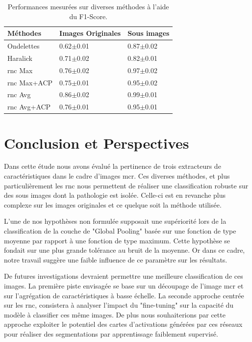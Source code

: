 \documentclass{gretsi}
\begin{document}
\begin{sloppypar}
\begin{table}[h]
\centering
    \begin{tabular*}{\linewidth}{l@{\extracolsep{\fill}}ll}
        \hline
        \textbf{Méthodes} & \textbf{Images Originales} & \textbf{Sous images}\\
        \hline
        Ondelettes & 0.62$\pm$0.01 & 0.87$\pm$0.02\\
        \hline
        Haralick & 0.71$\pm$0.02 & 0.82$\pm$0.01\\
        \hline
        \ac{rnc} Max & 0.76$\pm$0.02 & 0.97$\pm$0.02\\
        \hline
        \ac{rnc} Max+ACP & 0.75$\pm$0.01 & 0.95$\pm$0.02\\
        \hline
        \ac{rnc} Avg & 0.86$\pm$0.02 &0.99$\pm$0.01\\
        \hline
       \ac{rnc} Avg+ACP & 0.76$\pm$0.01 & 0.95$\pm$0.01\\
    \end{tabular*}
    \caption{Performances mesurées sur diverses méthodes à l'aide du F1-Score.}
    \label{scores}
\end{table}

\section{Conclusion et Perspectives}
\label{conclusion}
Dans cette étude nous avons évalué la pertinence de trois extracteurs de caractéristiques dans le cadre d'images \ac{mcr}. Ces diverses méthodes, et plus particulièrement les \ac{rnc} nous permettent de réaliser une classification robuste sur des sous images dont la pathologie est isolée. Celle-ci est en revanche plus complexe sur les images originales et ce quelque soit la méthode utilisée.\par 
L'une de nos hypothèses non formulée supposait une supériorité lors de la classification de la couche de "Global Pooling" basée sur une fonction de type moyenne par rapport à une fonction de type maximum. Cette hypothèse se fondait sur une plus grande tolérance au bruit de la moyenne. Or dans ce cadre, notre travail suggère une faible influence de ce paramètre sur les résultats.\par
De futures investigations devraient permettre une meilleure classification de ces images. La première piste envisagée se base sur un découpage de l'image \ac{mcr} et sur l'agrégation de caractéristiques à basse échelle. La seconde approche centrée sur les \acs{rnc}, consistera à analyser l'impact du "fine-tuning" sur la capacité du modèle à classifier ces même images. De plus nous souhaiterions par cette approche exploiter le potentiel des cartes d'activations générées par ces réseaux pour réaliser des segmentations par apprentissage faiblement supervisé.\par


\end{sloppypar}
\end{document}

